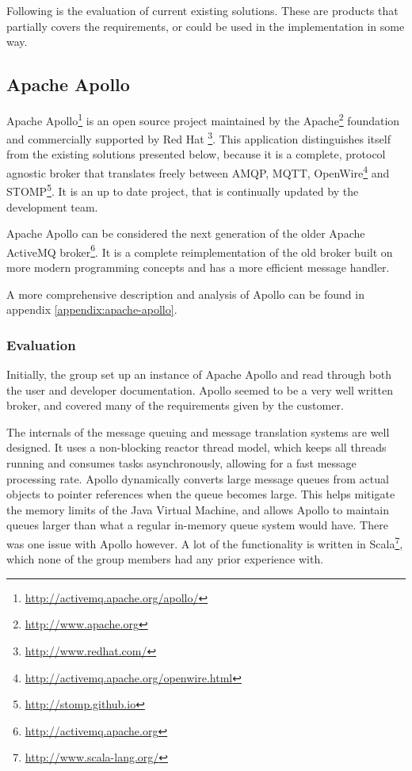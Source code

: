 Following is the evaluation of current existing solutions. These are products that partially covers the requirements, or could be used in the implementation in some way.

\subsection{Apache Apollo}
\label{subsec:prestudies-existing_solutions-apache_apollo}

Apache Apollo\footnote{\url{http://activemq.apache.org/apollo/}} is an open source project maintained by the Apache\footnote{\url{http://www.apache.org}} foundation and commercially supported by Red Hat \footnote{\url{http://www.redhat.com/}}. This application distinguishes itself from the existing solutions presented below, because it is a complete, protocol agnostic broker that translates freely between AMQP, MQTT, OpenWire\footnote{\url{http://activemq.apache.org/openwire.html}} and STOMP\footnote{\url{http://stomp.github.io}}. It is an up to date project, that is continually updated by the development team.

Apache Apollo can be considered the next generation of the older Apache ActiveMQ broker\footnote{\url{http://activemq.apache.org}}. It is a complete reimplementation of the old broker built on more modern programming concepts and has a more efficient message handler.

A more comprehensive description and analysis of Apollo can be found in appendix \ref{appendix:apache-apollo}.

\subsubsection{Evaluation}
\label{subsec:prestudies-existing_solutions-apache_apollo-evaluation}

Initially, the group set up an instance of Apache Apollo and read through both the user and developer documentation. Apollo seemed to be a very well written broker, and covered many of the requirements given by the customer.

The internals of the message queuing and message translation systems are well designed. It uses a non-blocking reactor thread model, which keeps all threads running and consumes tasks asynchronously, allowing for a fast message processing rate. Apollo dynamically converts large message queues from actual objects to pointer references when the queue becomes large. This helps mitigate the memory limits of the Java Virtual Machine, and allows Apollo to maintain queues larger than what a regular in-memory queue system would have. There was one issue with Apollo however. A lot of the functionality is written in Scala\footnote{\url{http://www.scala-lang.org/}}, which none of the group members had any prior experience with.

